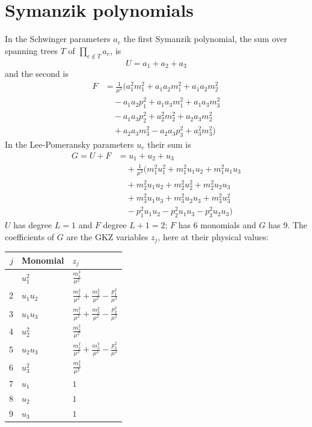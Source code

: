 \documentclass[11pt,a4paper]{article}
\begin{document}
\section{Symanzik polynomials}
In the Schwinger parameters $a_e$ the first Symanzik polynomial, the sum over spanning trees $T$ of $\prod_{e \notin T} a_e$, is
\begin{equation*}
U = a_{1} + a_{2} + a_{3}
\end{equation*}
and the second is
\begin{equation*}
\begin{split}
F &= \frac{1}{\mu^{2}}\bigl(a_{1}^{2} m_{1}^{2} + a_{1} a_{2} m_{1}^{2} + a_{1} a_{2} m_{2}^{2} \\
&\quad {}- a_{1} a_{2} p^{2}_{1} + a_{1} a_{3} m_{1}^{2} + a_{1} a_{3} m_{3}^{2} \\
&\quad {}- a_{1} a_{3} p^{2}_{2} + a_{2}^{2} m_{2}^{2} + a_{2} a_{3} m_{2}^{2} \\
&\quad {}+ a_{2} a_{3} m_{3}^{2} - a_{2} a_{3} p^{2}_{3} + a_{3}^{2} m_{3}^{2}\bigr)
\end{split}
\end{equation*}
In the Lee-Pomeransky parameters $u_e$ their sum is
\begin{equation*}
\begin{split}
G = U + F &= u_{1} + u_{2} + u_{3} \\
&\quad {}+ \frac{1}{\mu^{2}}\bigl(m_{1}^{2} u_{1}^{2} + m_{1}^{2} u_{1} u_{2} + m_{1}^{2} u_{1} u_{3} \\
&\quad {}+ m_{2}^{2} u_{1} u_{2} + m_{2}^{2} u_{2}^{2} + m_{2}^{2} u_{2} u_{3} \\
&\quad {}+ m_{3}^{2} u_{1} u_{3} + m_{3}^{2} u_{2} u_{3} + m_{3}^{2} u_{3}^{2} \\
&\quad {}- p^{2}_{1} u_{1} u_{2} - p^{2}_{2} u_{1} u_{3} - p^{2}_{3} u_{2} u_{3}\bigr)
\end{split}
\end{equation*}
$U$ has degree $L = 1$ and $F$ degree $L+1 = 2$; $F$ has 6 monomials and $G$ has 9. The coefficients of $G$ are the GKZ variables $z_j$, here at their physical values:
\begin{longtable}{rll}
\toprule
$j$ & Monomial & $z_j$ \\
\midrule
\endhead
\bottomrule
\endlastfoot
1 & $u_{1}^{2}$ & $\frac{m_{1}^{2}}{\mu^{2}}$ \\
2 & $u_{1} u_{2}$ & $\frac{m_{1}^{2}}{\mu^{2}} + \frac{m_{2}^{2}}{\mu^{2}} - \frac{p^{2}_{1}}{\mu^{2}}$ \\
3 & $u_{1} u_{3}$ & $\frac{m_{1}^{2}}{\mu^{2}} + \frac{m_{3}^{2}}{\mu^{2}} - \frac{p^{2}_{2}}{\mu^{2}}$ \\
4 & $u_{2}^{2}$ & $\frac{m_{2}^{2}}{\mu^{2}}$ \\
5 & $u_{2} u_{3}$ & $\frac{m_{2}^{2}}{\mu^{2}} + \frac{m_{3}^{2}}{\mu^{2}} - \frac{p^{2}_{3}}{\mu^{2}}$ \\
6 & $u_{3}^{2}$ & $\frac{m_{3}^{2}}{\mu^{2}}$ \\
7 & $u_{1}$ & $1$ \\
8 & $u_{2}$ & $1$ \\
9 & $u_{3}$ & $1$ \\
\end{longtable}
\end{document}
